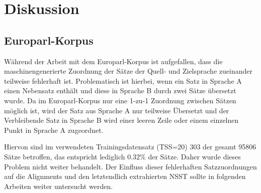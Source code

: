 \documentclass[conference]{IEEEtran}
\begin{document}


\section{Diskussion}
\subsection{Europarl-Korpus}
\label{korpusprobleme}
Während der Arbeit mit dem Europarl-Korpus ist aufgefallen, dass die maschinengenerierte Zuordnung der Sätze der Quell- und Zielsprache zueinander teilweise fehlerhaft ist.
Problematisch ist hierbei, wenn ein Satz in Sprache A einen Nebensatz enthält und diese in Sprache B durch zwei Sätze übersetzt wurde.
Da im Europarl-Korpus nur eine 1-zu-1 Zuordnung zwischen Sätzen möglich ist, wird der Satz aus Sprache A nur teilweise Übersetzt und der Verbleibende Satz in Sprache B wird einer leeren Zeile oder einem einzelnen Punkt in Sprache A zugeordnet.

Hiervon sind im verwendeten Trainingsdatensatz (TSS=20) 303 der gesamt 95806 Sätze betroffen, das entspricht lediglich 0.32\% der Sätze. 
Daher wurde dieses Problem nicht weiter behandelt. 
Der Einfluss dieser fehlerhaften Satzzuordnungen auf die Alignments und den letztendlich extrahierten NSST sollte in folgenden Arbeiten weiter untersucht werden.
\end{document}
